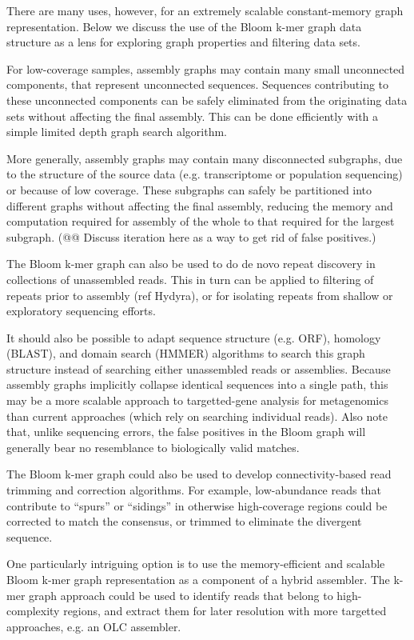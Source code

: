 \documentclass[12pt]{article} \usepackage{simplemargins}
\begin{document}
There are many uses, however, for an extremely scalable
constant-memory graph representation.  Below we discuss the use of the
Bloom k-mer graph data structure as a lens for exploring graph
properties and filtering data sets.

For low-coverage samples, assembly graphs may contain many small
unconnected components, that represent unconnected sequences.
Sequences contributing to these unconnected components can be safely
eliminated from the originating data sets without affecting the final
assembly.  This can be done efficiently with a simple limited depth
graph search algorithm.

More generally, assembly graphs may contain many disconnected
subgraphs, due to the structure of the source data (e.g. transcriptome
or population sequencing) or because of low coverage.  These subgraphs
can safely be partitioned into different graphs without affecting the
final assembly, reducing the memory and computation required for
assembly of the whole to that required for the largest subgraph.
(@@ Discuss iteration here as a way to get rid of false positives.)

The Bloom k-mer graph can also be used to do de novo repeat discovery
in collections of unassembled reads.  This in turn can be applied to
filtering of repeats prior to assembly (ref Hydyra), or for isolating
repeats from shallow or exploratory sequencing efforts.

It should also be possible to adapt sequence structure (e.g. ORF),
homology (BLAST), and domain search (HMMER) algorithms to search this
graph structure instead of searching either unassembled reads or
assemblies.  Because assembly graphs implicitly collapse identical
sequences into a single path, this may be a more scalable approach to
targetted-gene analysis for metagenomics than current approaches
(which rely on searching individual reads).  Also note that, unlike
sequencing errors, the false positives in the Bloom graph will
generally bear no resemblance to biologically valid matches.

The Bloom k-mer graph could also be used to develop connectivity-based
read trimming and correction algorithms.  For example, low-abundance
reads that contribute to ``spurs'' or ``sidings'' in otherwise
high-coverage regions could be corrected to match the
consensus, or trimmed to eliminate the divergent sequence.

One particularly intriguing option is to use the memory-efficient and
scalable Bloom k-mer graph representation as a component of a hybrid
assembler.  The k-mer graph approach could be used to identify
reads that belong to high-complexity regions, and extract them for
later resolution with more targetted approaches, e.g. an OLC assembler.
\end{document}
